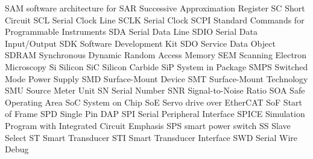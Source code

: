 		{SAM}		{software architecture for {}}
		{SAR} 		{Successive Approximation Register}
			{SC}		{Short Circuit}
		{SCL}		{Serial Clock Line}
		{SCLK}		{Serial Clock}
		{SCPI}		{Standard Commands for Programmable Instruments}
		{SDA}		{Serial Data Line}
		{SDIO}		{Serial Data Input/Output}
		{SDK}		{Software Development Kit}
		{SDO}		{Service Data Object}
		{SDRAM}		{Synchronous Dynamic Random Access Memory}
		{SEM}		{Scanning Electron Microscopy}
			{Si}		{Silicon}
		{SiC}		{Silicon Carbide}
		{SiP}		{System in Package}
		{SMPS}		{Switched Mode Power Supply}
		{SMD}		{Surface-Mount Device}
		{SMT}		{Surface-Mount Technology}
		{SMU}		{Source Meter Unit}
			{SN}		{Serial Number}
		{SNR}		{Signal-to-Noise Ratio}
		{SOA}		{Safe Operating Area}
		{SoC}		{System on Chip}
		{SoE}		{Servo drive over EtherCAT}
		{SoF}		{Start of Frame}
		{SPD}		{Single Pin {\acrshort{DAP}}}
		{SPI}		{Serial Peripheral Interface}
		{SPICE}		{Simulation Program with Integrated Circuit Emphasis}
		{SPS}		{smart power switch}
			{SS}		{Slave Select}
			{ST}		{Smart Transducer}
		{STI}		{Smart Transducer Interface}
		{SWD}		{Serial Wire Debug}

